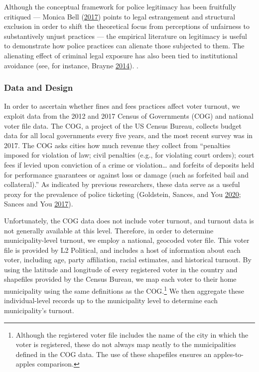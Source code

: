 \documentclass[
  12pt,
]{article}
\begin{document}
Although the conceptual framework for police legitimacy has been fruitfully critiqued --- Monica Bell (\protect\hyperlink{ref-Bell2017}{2017}) points to legal estrangement and structural exclusion in order to shift the theoretical focus from perceptions of unfairness to substantively unjust practices --- the empirical literature on legitimacy is useful to demonstrate how police practices can alienate those subjected to them. The alienating effect of criminal legal exposure has also been tied to institutional avoidance (see, for instance, Brayne \protect\hyperlink{ref-Brayne2014}{2014}). .

\hypertarget{data-and-design}{%
\subsubsection*{Data and Design}\label{data-and-design}}

In order to ascertain whether fines and fees practices affect voter turnout, we exploit data from the 2012 and 2017 Census of Governments (COG) and national voter file data. The COG, a project of the US Census Bureau, collects budget data for all local governments every five years, and the most recent survey was in 2017. The COG asks cities how much revenue they collect from ``penalties imposed for violation of law; civil penalties (e.g., for violating court orders); court fees if levied upon conviction of a crime or violation\ldots{} and forfeits of deposits held for performance guarantees or against loss or damage (such as forfeited bail and collateral).'' As indicated by previous researchers, these data serve as a useful proxy for the prevalence of police ticketing (Goldstein, Sances, and You \protect\hyperlink{ref-Goldstein2020}{2020}; Sances and You \protect\hyperlink{ref-Sances2017}{2017}).

Unfortunately, the COG data does not include voter turnout, and turnout data is not generally available at this level. Therefore, in order to determine municipality-level turnout, we employ a national, geocoded voter file. This voter file is provided by L2 Political, and includes a host of information about each voter, including age, party affiliation, racial estimates, and historical turnout. By using the latitude and longitude of every registered voter in the country and shapefiles provided by the Census Bureau, we map each voter to their home municipality using the same definitions as the COG.\footnote{Although the registered voter file includes the name of the city in which the voter is registered, these do not always map neatly to the municipalities defined in the COG data. The use of these shapefiles ensures an apples-to-apples comparison.} We then aggregate these individual-level records up to the municipality level to determine each municipality's turnout.
\end{document}
